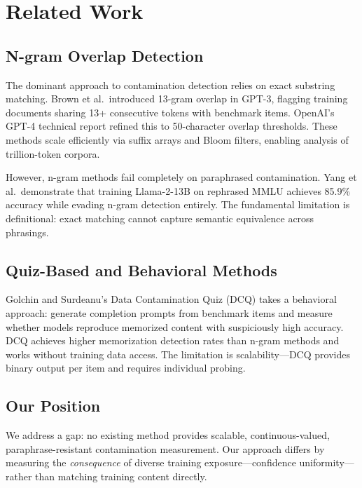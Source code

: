 \section{Related Work}

\subsection{N-gram Overlap Detection}

The dominant approach to contamination detection relies on exact substring matching. Brown et al.\ introduced 13-gram overlap in GPT-3, flagging training documents sharing 13+ consecutive tokens with benchmark items. OpenAI's GPT-4 technical report refined this to 50-character overlap thresholds. These methods scale efficiently via suffix arrays and Bloom filters, enabling analysis of trillion-token corpora.

However, n-gram methods fail completely on paraphrased contamination. Yang et al.\ demonstrate that training Llama-2-13B on rephrased MMLU achieves 85.9\% accuracy while evading n-gram detection entirely. The fundamental limitation is definitional: exact matching cannot capture semantic equivalence across phrasings.

\subsection{Quiz-Based and Behavioral Methods}

Golchin and Surdeanu's Data Contamination Quiz (DCQ) takes a behavioral approach: generate completion prompts from benchmark items and measure whether models reproduce memorized content with suspiciously high accuracy. DCQ achieves higher memorization detection rates than n-gram methods and works without training data access. The limitation is scalability---DCQ provides binary output per item and requires individual probing.

\subsection{Our Position}

We address a gap: no existing method provides scalable, continuous-valued, paraphrase-resistant contamination measurement. Our approach differs by measuring the \emph{consequence} of diverse training exposure---confidence uniformity---rather than matching training content directly.

